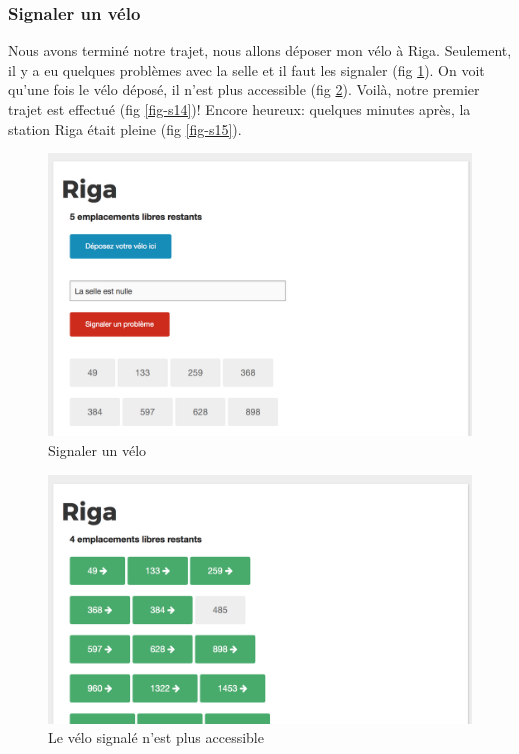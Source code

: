 \documentclass[a4paper]{article}
\begin{document}
    \subsubsection{Signaler un vélo}
    Nous avons terminé notre trajet, nous allons déposer mon vélo à Riga. Seulement, il y a eu quelques problèmes avec la selle et il faut les signaler (fig \ref{fig-s12}). On voit qu'une fois le vélo déposé, il n'est plus accessible (fig \ref{fig-s13}). Voilà, notre premier trajet est effectué (fig \ref{fig-s14})! Encore heureux: quelques minutes après, la station Riga était pleine (fig \ref{fig-s15}).
    
    \begin{figure}
    \includegraphics[width=\textwidth]{images/s12.png}
    \caption{Signaler un vélo}
    \label{fig-s12}
    \end{figure}
    
    \begin{figure}
    \includegraphics[width=\textwidth]{images/s13.png}
    \caption{Le vélo signalé n'est plus accessible}
    \label{fig-s13}
    \end{figure}
    
\end{document}
